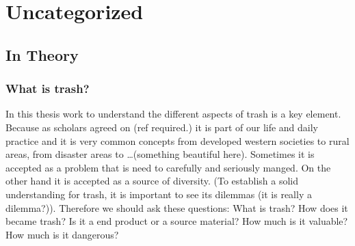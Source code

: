\chapter{Uncategorized}




\section{In Theory}

\subsection{What is trash?}
In this thesis work to understand the different aspects of trash is a key element. Because as scholars agreed on (ref required.) it is part of our life and daily practice and it is very common concepts from developed western societies to rural areas, from disaster areas to \ldots(something beautiful here). Sometimes it is accepted as a problem that is need to carefully and seriously manged. On the other hand it is accepted as a source of diversity. (To establish a solid understanding for trash, it is important to see its dilemmas (it is really a dilemma?)). Therefore we should ask these questions: What is trash? How does it became trash? Is it a end product or a source material? How much is it valuable? How much is it dangerous?

